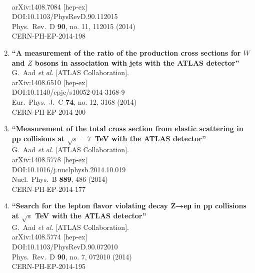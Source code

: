 \documentclass{article}
\begin{document}
\begin{enumerate}
  \\{}arXiv:1408.7084 [hep-ex]
  \\{}DOI:10.1103/PhysRevD.90.112015
  \\{}Phys.\ Rev.\ D {\bf 90}, no. 11, 112015 (2014)
  \\{}CERN-PH-EP-2014-198
\item%
{\bf ``A measurement of the ratio of the production cross sections for $W$ and $Z$ bosons in association with jets with the ATLAS detector''}
  \\{}G.~Aad {\it et al.} [ATLAS Collaboration].
  \\{}arXiv:1408.6510 [hep-ex]
  \\{}DOI:10.1140/epjc/s10052-014-3168-9
  \\{}Eur.\ Phys.\ J.\ C {\bf 74}, no. 12, 3168 (2014)
  \\{}CERN-PH-EP-2014-200
\item%
{\bf ``Measurement of the total cross section from elastic scattering in pp collisions at $\sqrt{s}=7$ TeV with the ATLAS detector''}
  \\{}G.~Aad {\it et al.} [ATLAS Collaboration].
  \\{}arXiv:1408.5778 [hep-ex]
  \\{}DOI:10.1016/j.nuclphysb.2014.10.019
  \\{}Nucl.\ Phys.\ B {\bf 889}, 486 (2014)
  \\{}CERN-PH-EP-2014-177
\item%
{\bf ``Search for the lepton flavor violating decay Z→eμ in pp collisions at $\sqrt{s}$  TeV with the ATLAS detector''}
  \\{}G.~Aad {\it et al.} [ATLAS Collaboration].
  \\{}arXiv:1408.5774 [hep-ex]
  \\{}DOI:10.1103/PhysRevD.90.072010
  \\{}Phys.\ Rev.\ D {\bf 90}, no. 7, 072010 (2014)
  \\{}CERN-PH-EP-2014-195

\end{enumerate}
\end{document}
